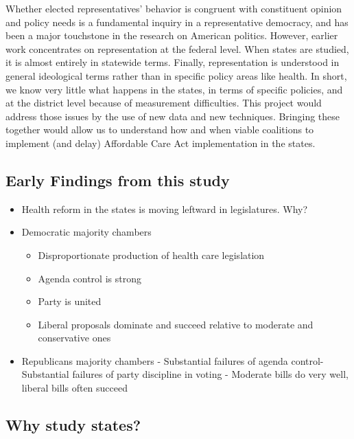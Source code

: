 \documentclass[
  oneside]{book}
\providecommand{\tightlist}{%
  \setlength{\itemsep}{0pt}\setlength{\parskip}{0pt}}
\begin{document}
Whether elected representatives' behavior is congruent with constituent opinion and policy needs is a fundamental inquiry in a representative democracy, and has been a major touchstone in the research on American politics. However, earlier work concentrates on representation at the federal level. When states are studied, it is almost entirely in statewide terms. Finally, representation is understood in general ideological terms rather than in specific policy areas like health. In short, we know very little what happens in the states, in terms of specific policies, and at the district level because of measurement difficulties. This project would address those issues by the use of new data and new techniques. Bringing these together would allow us to understand how and when viable coalitions to implement (and delay) Affordable Care Act implementation in the states.

\hypertarget{early-findings-from-this-study}{%
\subsection{Early Findings from this study}\label{early-findings-from-this-study}}

\begin{itemize}
\tightlist
\item
  Health reform in the states is moving leftward in legislatures. Why?
\item
  Democratic majority chambers

  \begin{itemize}
  \tightlist
  \item
    Disproportionate production of health care legislation
  \item
    Agenda control is strong
  \item
    Party is united
  \item
    Liberal proposals dominate and succeed relative to moderate and conservative ones
  \end{itemize}
\item
  Republicans majority chambers
  - Substantial failures of agenda control- Substantial failures of party discipline in voting
  - Moderate bills do very well, liberal bills often succeed
\end{itemize}

\hypertarget{why-study-states}{%
\subsection{Why study states?}\label{why-study-states}}
\end{document}
